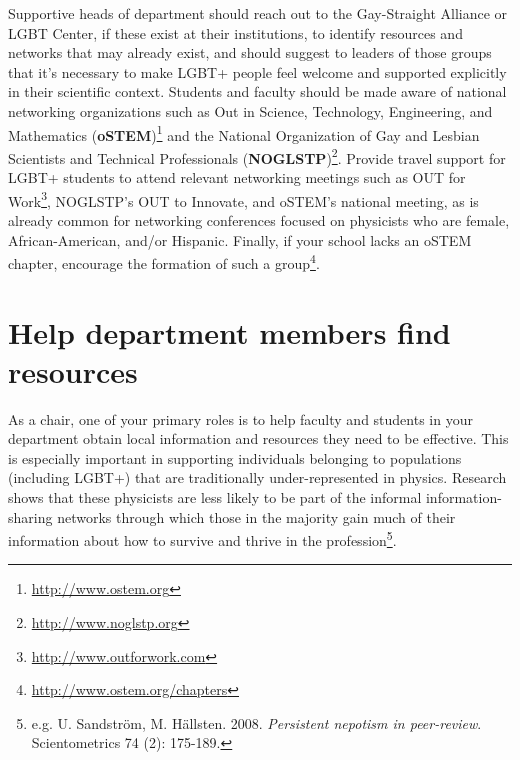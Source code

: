 Supportive heads of department should reach out to the Gay-Straight Alliance or LGBT Center, if these exist at their institutions, to identify resources and networks that may already exist, and should suggest to leaders of those groups that it's necessary to make LGBT+ people feel welcome and supported explicitly in their scientific context. Students and faculty should be made aware of national networking organizations such as Out in Science, Technology, Engineering, and Mathematics (\textbf{oSTEM})\footnote{\href{http://www.ostem.org}{http://www.ostem.org}} and the National Organization of Gay and Lesbian Scientists and Technical Professionals (\textbf{NOGLSTP})\footnote{\href{http://www.noglstp.org}{http://www.noglstp.org}}. Provide travel support for LGBT+ students to attend relevant networking meetings such as OUT for Work\footnote{\href{http://www.outforwork.com}{http://www.outforwork.com}}, NOGLSTP's OUT to Innovate, and oSTEM's national meeting, as is already common for networking conferences focused on physicists who are female, African-American, and/or Hispanic. Finally, if your school lacks an oSTEM chapter, encourage the formation of such a group\footnote{\href{http://www.ostem.org/chapters}{http://www.ostem.org/chapters}}.


\section {Help department members find resources}
\label{find-resources}
As a chair, one of your primary roles is to help faculty and students in your department obtain local information and resources they need to be effective. This is especially important in supporting individuals belonging to populations (including LGBT+) that are traditionally under-represented in physics. Research shows that these physicists are less likely to be part of the informal information-sharing networks through which those in the majority gain much of their information about how to survive and thrive in the profession\footnote{e.g. U. Sandstr\"{o}m, M. H\"{a}llsten. 2008. \emph{Persistent nepotism in peer-review}. Scientometrics 74 (2): 175-189.}.

